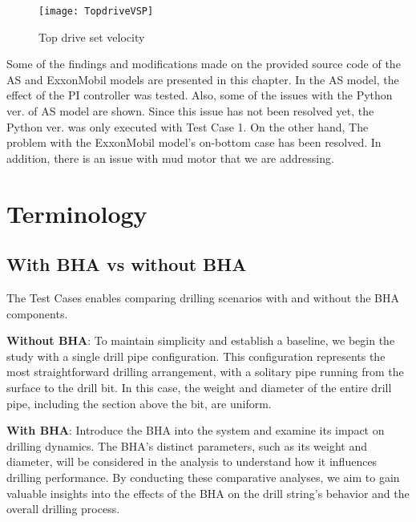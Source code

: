 \begin{figure}[!hbt]
  \centering
  \texttt{[image: TopdriveVSP]}
  \caption[Top drive set velocity]{Top drive set velocity}\label{figure_topdrive_VSP}
\end{figure}

Some of the findings and modifications made on the provided source code of the AS and ExxonMobil models are presented in this chapter. In the AS model, the effect of the PI controller was tested. Also, some of the issues with the Python ver. of AS model are shown. Since this issue has not been resolved yet, the Python ver. was only executed with Test Case 1. On the other hand, The problem with the ExxonMobil model's on-bottom case has been resolved. In addition, there is an issue with mud motor that we are addressing. 
\section{Terminology}
\subsection{With BHA vs without BHA}

The Test Cases enables comparing drilling scenarios with and without the BHA components. 

\textbf{Without BHA}: To maintain simplicity and establish a baseline, we begin the study with a single drill pipe configuration. This configuration represents the most straightforward drilling arrangement, with a solitary pipe running from the surface to the drill bit. In this case, the weight and diameter of the entire drill pipe, including the section above the bit, are uniform.

\textbf{With BHA}: Introduce the BHA into the system and examine its impact on drilling dynamics. The BHA's distinct parameters, such as its weight and diameter, will be considered in the analysis to understand how it influences drilling performance. By conducting these comparative analyses, we aim to gain valuable insights into the effects of the BHA on the drill string's behavior and the overall drilling process.


